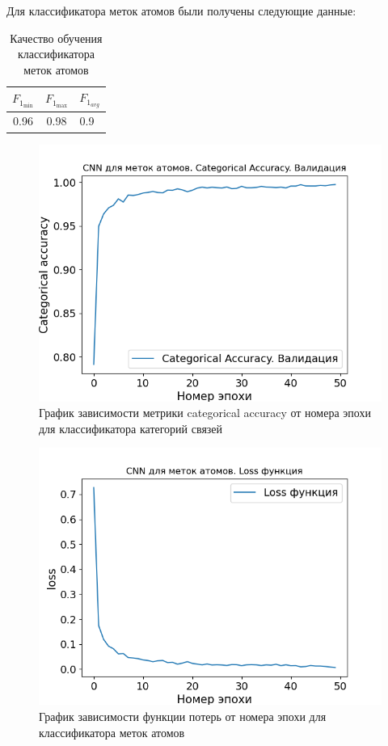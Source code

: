 Для классификатора меток атомов были получены следующие данные:

\begin{table}[htbp]%
	\centering
	\label{tab:atom_quality}		
	\begin{tabular}{|c|c|c|}
		\hline
		$F_{1_{\min}}$ & $F_{1_{\max}}$ & $F_{1_{avg}}$ \\
		\hline
		0.96 & 0.98 & 0.9\ \\
		\hline
	\end{tabular}
	\caption{Качество обучения классификатора меток атомов}
\end{table}

\begin{figure}[ht!] 
	\center
	\includegraphics [scale=0.8] {my_folder/images/atom_accuracy}
	\caption{График зависимости метрики categorical accuracy от номера эпохи для классификатора категорий связей}
	\label{fig:AP50_atom_accuracy}
\end{figure}

\begin{figure}[ht!] 
	\center
	\includegraphics [scale=0.8] {my_folder/images/atom_loss}
	\caption{График зависимости функции потерь от номера эпохи для классификатора меток атомов}
	\label{fig:AP50_atom_loss}
\end{figure}


